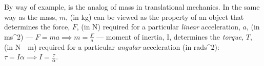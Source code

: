 By way of example,  is the analog of {mass} in
translational mechanics. In the same way as the mass, $m$, (in
\unit{kg}) can be viewed as the property of an object that determines
the force, $F$, (in \unit{N}) required for a particular \emph{linear}
acceleration, $a$, (in \unit{m}{s^2}) --- $F=ma \implies
m=\frac{F}{a}$ --- moment of inertia, I, determines the \emph{torque},
$T$, (in \unit{N\cdot m}) required for a particular \emph{angular}
acceleration (in \unit{rad}{s^2}): $\tau=I\alpha \implies
I=\frac{\tau}{\alpha}$.
